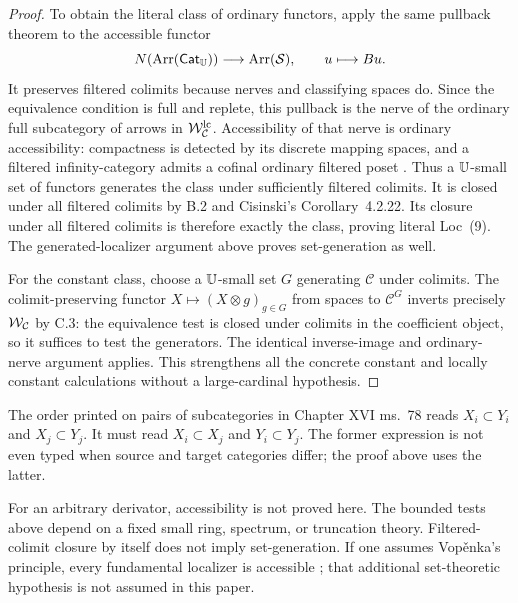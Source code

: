 \begin{proof}
To obtain the literal class of ordinary functors, apply
the same pullback theorem to the accessible functor
\[
 N(\operatorname{Arr}(\mathsf{Cat}_\mathbb U))\longrightarrow
       \operatorname{Arr}(\mathcal S),\qquad u\longmapsto Bu.
\]
It preserves filtered colimits because nerves and classifying
spaces do. Since the equivalence condition is full and replete,
this pullback is the nerve of the ordinary full subcategory
of arrows in $\mathcal W^{\mathrm{lc}}_{\mathcal C}$. Accessibility
of that nerve is ordinary accessibility: compactness is
detected by its discrete mapping spaces, and a filtered
infinity-category admits a cofinal ordinary filtered poset
\citep[Proposition~5.3.1.18]{EF_LurieHTT}.
Thus a $\mathbb U$-small set of functors generates the class under
sufficiently filtered colimits. It is closed under all
filtered colimits by B.2 and Cisinski's Corollary~4.2.22.
Its closure under all filtered colimits is therefore exactly
the class, proving literal Loc~(9). The generated-localizer
argument above proves set-generation as well.

For the constant class, choose a $\mathbb U$-small set $G$
generating $\mathcal C$ under colimits. The colimit-preserving
functor $X\mapsto(X\otimes g)_{g\in G}$ from spaces to
$\mathcal C^G$ inverts precisely $\mathcal W_{\mathcal C}$ by C.3:
the equivalence test is closed under colimits in the coefficient
object, so it suffices to test the generators. The identical
inverse-image and ordinary-nerve argument applies. This
strengthens all the concrete constant and locally constant
calculations without a large-cardinal hypothesis.
\end{proof}

The order printed on pairs of subcategories in Chapter XVI
ms.~78 reads $X_i\subset Y_i$ and $X_j\subset Y_j$.
It must read $X_i\subset X_j$ and $Y_i\subset Y_j$.
The former expression is not even typed when source and
target categories differ; the proof above uses the latter.

For an arbitrary derivator, accessibility is not proved here.
The bounded tests above depend on a fixed small ring, spectrum,
or truncation theory. Filtered-colimit closure by itself does
not imply set-generation. If one assumes Vop\v enka's
principle, every fundamental localizer is accessible
\citep[Scholie~4.2.17]{Cisinski2006}; that additional
set-theoretic hypothesis is not assumed in this paper.
